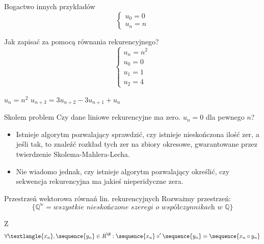 \documentclass{beamer}
\theoremstyle{definition}
\begin{document}
\begin{frame}{Bogactwo innych przykładów}
    \begin{equation}
    \begin{cases}
        u_0 = 0 \\
        u_n = n
    \end{cases}
    \end{equation}

    Jak zapisać za pomocą równania rekurencyjnego? 
    \begin{equation}
    \begin{cases}
        u_n = n^{2} \\
        u_0 = 0 \\
        u_1 = 1 \\ 
        u_2 = 4
    \end{cases}
    \end{equation}
\end{frame}

\begin{frame}{$u_n = n^{2}$}
    $u_{n+3} = 3 u_{n+2} - 3 u_{n+1} + u_{n} $
\end{frame}

\begin{frame}{Skolem problem}
    Czy dane liniowe rekurencyjne ma zero. 
    $u_n = 0$ dla pewnego $n$?
    \begin{itemize}
        \item Istnieje algorytm pozwalający sprawdzić, czy istnieje nieskończona ilość zer, a jeśli tak, to znaleźć rozkład tych zer na zbiory okresowe, gwarantowane przez twierdzenie Skolema-Mahlera-Lecha. 
        \item Nie wiadomo jednak, czy istnieje algorytm pozwalający określić, czy sekwencja rekurencyjna ma jakieś nieperidyczne zera. 
    \end{itemize}
\end{frame}

\begin{frame}{Przestrzeń wektorowa równań lin. rekurencyjnych}
    Rozważmy przestrzeń:
    \begin{equation}

    \{
        \mathbb{Q^{w}} = 
        \textit{wszystkie nieskończone szeregi o współczynnikach w } \mathbb{Q} 
    \}
            
    \end{equation}
    
    
    Z $$\forall \textlangle {x_n}, \sequence {y_n} \in R^{\N}: \sequence {x_n} \circ' \sequence {y_n} = \sequence {x_n \circ y_n}$$
\end{frame}
\end{document}
